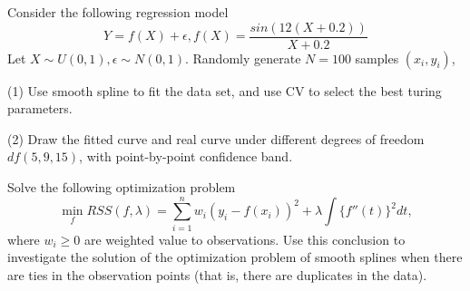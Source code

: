\begin{problem}[15.1]
    Consider the following regression model
    \begin{equation*}
        Y=f(X)+\epsilon,  f(X)=\frac{sin(12(X+0.2))}{X+0.2}
    \end{equation*}
    Let $X\sim U(0,1), \epsilon\sim N(0,1)$. Randomly generate $N=100$ samples $(x_i,y_i)$, 

    (1) Use smooth spline to fit the data set, and use CV to select the best turing parameters. 

    (2) Draw the fitted curve and real curve under different degrees of freedom $df (5,9,15)$, with point-by-point confidence band.
\end{problem}

\begin{problem}[15.1]
    Solve the following optimization problem
    \begin{equation*}
        \min_f RSS(f,\lambda)= \sum_{i=1}^n w_i (y_i - f(x_i))^2 + \lambda \int \{f''(t)\}^2dt,
    \end{equation*}
    where $w_i\ge 0$ are weighted value to observations. 
    Use this conclusion to investigate the solution of the optimization problem of smooth splines when there are ties in the observation points (that is, there are duplicates in the data).
\end{problem}

